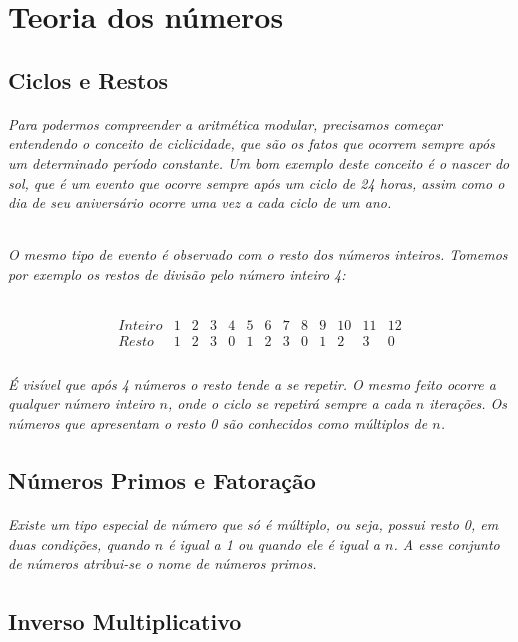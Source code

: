 \chapter {Teoria dos n\'umeros}
\label{Num}

\section{Ciclos e Restos}	
\subparagraph{
Para podermos compreender a aritm\'etica modular, precisamos come\c{c}ar entendendo o conceito de ciclicidade, que s\~ao os fatos que ocorrem sempre ap\'os um determinado per\'iodo constante. Um bom exemplo deste conceito \'e o nascer do sol, que \'e um evento que ocorre sempre ap\'os um ciclo de {24} horas, assim como o dia de seu anivers\'ario ocorre uma vez a cada ciclo de um ano.
}
\subparagraph{
O mesmo tipo de evento \'e observado com o resto dos n\'umeros inteiros. Tomemos por exemplo os restos de divis\~ao pelo n\'umero inteiro {4}:
}

\[
\begin{array}{ccccccccccccc}
  {Inteiro} & 1 & 2 & 3 & 4 & 5 & 6 & 7 & 8 & 9 & 10 &  11 & 12 \\  
	{Resto} & 1 & 2 & 3 & 0 & 1 & 2 & 3 & 0 & 1 & 2  &  3 & 0 \\ 
\end{array}
\]

\subparagraph{
\'E vis\'ivel que ap\'os {4} n\'umeros o resto tende a se repetir. O mesmo feito ocorre a qualquer n\'umero inteiro $n$, onde o ciclo se repetir\'a sempre a cada $n$ itera\c{c}\~oes. Os n\'umeros que apresentam o resto {0} s\~ao conhecidos como m\'ultiplos de $n$.
}

\section{N\'{u}meros Primos e Fatora\c{c}\~{a}o}

\subparagraph{
Existe um tipo especial de n\'umero que s\'o \'e m\'ultiplo, ou seja, possui resto {0}, em duas condi\c{c}\~oes, quando $n$ \'e igual a {1} ou quando ele \'e igual a $n$. A esse conjunto de n\'umeros atribui-se o nome de \textit{n\'umeros primos}.
}


\section{Inverso Multiplicativo}
